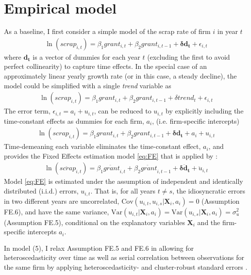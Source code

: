 \section{Empirical model}
\label{s:model}
As a baseline, I first consider a simple model of the scrap rate of firm $i$ in year $t$
\begin{align}\label{eq:baseline}
    \ln\left(scrap_{i,t}\right)
    = \beta_1grant_{i,t} + \beta_2grant_{i,t-1} + \bm{\delta d_t} + \epsilon_{i,t}
\end{align}
where $\bm{d_t}$ is a vector of dummies for each year $t$ (excluding the first to avoid perfect collinearity) to capture time effects. In the special case of an approximately linear yearly growth rate (or in this case, a steady decline), the model could be simplified with a single \emph{trend} variable as
\begin{align}\label{eq:trend}
    \ln\left(scrap_{i,t}\right)
    = \beta_1grant_{i,t} + \beta_2grant_{i,t-1} + \delta trend_t + \epsilon_{i,t}
\end{align}
The error term, $\epsilon_{i,t}=a_i+u_{i,t}$, can be reduced to $u_{i,t}$ by explicitly including the time-constant effects as dummies for each firm, $a_i$, (i.e. firm-specific intercepts)
\begin{align}\label{eq:dummies}
    \ln\left(scrap_{i,t}\right)
    = \beta_1grant_{i,t} + \beta_2grant_{i,t-1} + \bm{\delta d_t} + a_i + u_{i,t}
\end{align}
Time-demeaning each variable eliminates the time-constant effect, $a_i$, and provides the Fixed Effects estimation model \eqref{eq:FE} that is applied by \citet[example 14.1, pp. 464-465]{wooldridge2015introductory}:
\begin{align}\label{eq:FE}
    \ln\left(\ddot{scrap}_{i,t}\right)
    = \beta_1\ddot{grant}_{i,t} + \beta_2\ddot{grant}_{i,t-1} + \bm{\delta \ddot{d}_t} + \ddot{u}_{i,t}
\end{align}
Model \eqref{eq:FE} is estimated under the assumption of independent and identically distributed (i.i.d.) errors, $u_{i,t}$. That is, for all years $t\neq s$, the idiosyncratic errors in two different years are uncorrelated, $\text{Cov}(u_{i,t},u_{i,s}|\bm{X}_i,a_i)=0$ (Assumption FE.6), and have the same variance, $\text{Var}(u_{i,t}|\bm{X}_i,a_i)=\text{Var}(u_{i,s}|\bm{X}_i,a_i)=\sigma^2_u$ (Assumption FE.5), conditional on the explanatory variables $\bm{X}_i$ and the firm-specific intercepts $a_i$.

In model (5), I relax Assumption FE.5 and FE.6 in allowing for heteroscedasticity over time as well as serial correlation between observations for the same firm by applying heteroscedasticity- and cluster-robust standard errors \citep*[see][appendix 14A.2, pp. 493-494]{wooldridge2015introductory}.